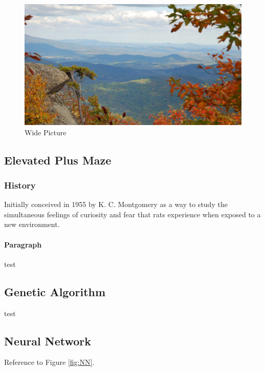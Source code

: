 \begin{figure}[ht]\centering %
\includegraphics[width=\linewidth]{view}
\caption{Wide Picture}
\label{fig:view}
\end{figure}


\subsection{Elevated Plus Maze}

\subsubsection*{History} 
Initially conceived in 1955 by K. C. Montgomery as a way to study the simultaneous feelings of curiosity and fear that rats experience when exposed to a new environment.
\paragraph{Paragraph} test %

\subsection{Genetic Algorithm}

test %

\subsection{Neural Network}

Reference to Figure \ref{fig:NN}.


